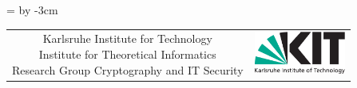 { %
\footnotesize\sffamily
\newdimen\addresswidth
\addresswidth=\textwidth
\advance\addresswidth by -3cm
\noindent\begin{tabular}{@{}c@{}c@{}}
\parbox{\addresswidth}{Karlsruhe Institute for Technology\\Institute for Theoretical Informatics\\Research Group Cryptography and IT Security} & \parbox{3cm}{\includegraphics[width=3cm]{./logos/kit-en.pdf}}
\end{tabular}
} %

\vspace{\baselineskip}

\begin{center}
\makeatletter
{\Large\bfseries\@title\\}
\vspace{\baselineskip}
{
\@author\\
\@subtitle{}\\
\@date
\makeatother
}
\end{center}

\vspace{\baselineskip}
